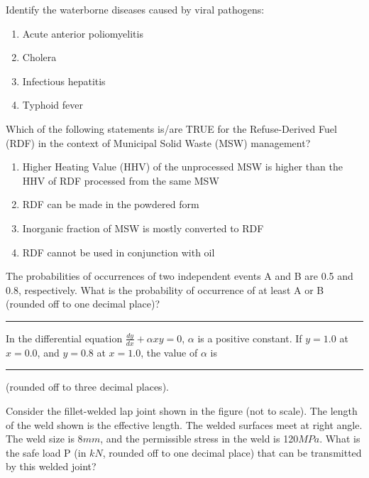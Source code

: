 \iffalse
  \author{EE24BTECH11007}
  \section{ce}
  \chapter{2023}
\fi
\item Identify the waterborne diseases caused by viral pathogens:
\begin{enumerate}
\item Acute anterior poliomyelitis
\item Cholera
\item Infectious hepatitis
\item Typhoid fever
\end{enumerate}
\item Which of the following statements is/are TRUE for the Refuse-Derived Fuel (RDF) in the context of Municipal Solid Waste (MSW) management?
\begin{enumerate}
\item Higher Heating Value (HHV) of the unprocessed MSW is higher than the HHV of RDF processed from the same MSW
\item RDF can be made in the powdered form
\item Inorganic fraction of MSW is mostly converted to RDF
\item RDF cannot be used in conjunction with oil
\end{enumerate}
\item  The probabilities of occurrences of two independent events A and B are 0.5 and 0.8, respectively. What is the probability of occurrence of at least A or B (rounded off to one decimal place)?\rule{2cm}{0.15mm}
\item In the differential equation $\frac{dy}{dx}+\alpha xy=0$, $\alpha$ is a positive constant. If $y=1.0$ at $x=0.0$, and $y=0.8$ at $x=1.0$, the value of $\alpha$ is \rule{2cm}{0.15mm}(rounded off to three decimal places).
\item Consider the fillet-welded lap joint shown in the figure (not to scale). The length of the weld shown is the effective length. The welded surfaces meet at right angle. The weld size is 8$mm$, and the permissible stress in the weld is 120$MPa$. What is the safe load P (in $kN$, rounded off to one decimal place) that can be transmitted by this welded joint?
